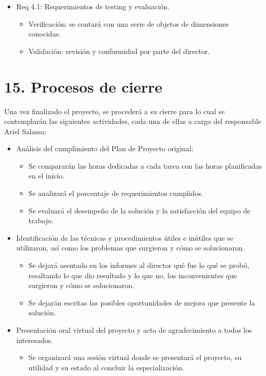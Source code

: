 \documentclass[
11pt, %
]{charter}
\begin{document}
\begin{itemize}
\item Req 4.1: Requerimientos de testing y evaluación.
\begin{itemize}
	\item Verificación: se contará con una serie de objetos de dimensiones conocidas.
	\item Validación: revisión y conformidad por parte del director.
\end{itemize}

\end{itemize}

\section{15. Procesos de cierre}    
\label{sec:cierre}

Una vez finalizado el proyecto, se procederá a su cierre para lo cual se contemplarán las siguientes actividades, cada una de ellas a cargo del responsable Ariel Salassa:

\begin{itemize}
	\item Análisis del cumplimiento del Plan de Proyecto original:
		\begin{itemize}
			\item Se compararán las horas dedicadas a cada tarea con las horas planificadas en el inicio.
			\item Se analizará el porcentaje de requerimientos cumplidos.
			\item Se evaluará el desempeño de la solución y la satisfacción del equipo de trabajo. 
		\end{itemize}
	\item Identificación de las técnicas y procedimientos útiles e inútiles que se utilizaron, así como los problemas que surgieron y cómo se solucionaron.
		\begin{itemize}
			\item Se dejará asentado en los informes al director qué fue lo qué se probó, resaltando lo que dio resultado y lo que no, los inconvenientes que surgieron y cómo se solucionaron. 
			\item Se dejarán escritas las posibles oportunidades de mejora que presente la solución.
		\end{itemize}
	\item Presentación oral virtual del proyecto y acto de agradecimiento a todos los interesados.
	\begin{itemize}
			\item Se organizará una sesión virtual donde se presentará el proyecto, su utilidad y su estado al concluir la especialización.
		\end{itemize}
\end{itemize}
\end{document}
